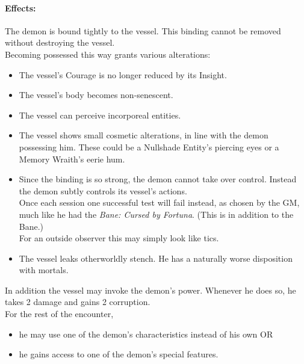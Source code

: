 \paragraph{Effects:}
The demon is bound tightly to the vessel.
This binding cannot be removed without destroying the vessel.
\\%
Becoming possessed this way grants various alterations:
\begin{itemize}
	\setlength\itemsep{-8mm} \vspace{-8mm}
	\item The vessel's Courage is no longer reduced by its Insight.
	\item The vessel's body becomes non-senescent.
	\item The vessel can perceive incorporeal entities.
	\item The vessel shows small cosmetic alterations, in line with the demon possessing him.
		These could be a Nullshade Entity's piercing eyes or a Memory Wraith's eerie hum.
	\item Since the binding is so strong, the demon cannot take over control.
		Instead the demon subtly controls its vessel's actions.
		\\%
		Once each session one successful test will fail instead, as chosen by the GM,
			much like he had the \emph{Bane: Cursed by Fortuna}.
		(This is in addition to the Bane.)
		\\%
		For an outside observer this may simply look like tics.
	\item The vessel leaks otherworldly stench.
		He has a naturally worse disposition with mortals.
\end{itemize}
In addition the vessel may invoke the demon's power.
Whenever he does so, he takes 2 damage and gains 2 corruption.
\\%
For the rest of the encounter,
\begin{itemize}
	\setlength\itemsep{-8mm} \vspace{-8mm}
	\item he may use one of the demon's characteristics instead of his own OR
	\item he gains access to one of the demon's special features.
\end{itemize}
